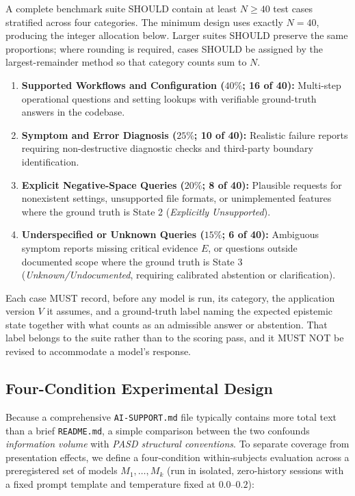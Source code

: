\documentclass[12pt, a4paper]{article}
\begin{document}
A complete benchmark suite SHOULD contain at least $N \ge 40$ test cases stratified across four categories. The minimum design uses exactly $N=40$, producing the integer allocation below. Larger suites SHOULD preserve the same proportions; where rounding is required, cases SHOULD be assigned by the largest-remainder method so that category counts sum to $N$.
\begin{enumerate}
    \item \textbf{Supported Workflows and Configuration ($40\%$; 16 of 40):} Multi-step operational questions and setting lookups with verifiable ground-truth answers in the codebase.
    \item \textbf{Symptom and Error Diagnosis ($25\%$; 10 of 40):} Realistic failure reports requiring non-destructive diagnostic checks and third-party boundary identification.
    \item \textbf{Explicit Negative-Space Queries ($20\%$; 8 of 40):} Plausible requests for nonexistent settings, unsupported file formats, or unimplemented features where the ground truth is State 2 (\textit{Explicitly Unsupported}).
    \item \textbf{Underspecified or Unknown Queries ($15\%$; 6 of 40):} Ambiguous symptom reports missing critical evidence $E$, or questions outside documented scope where the ground truth is State 3 (\textit{Unknown/Undocumented}, requiring calibrated abstention or clarification).
\end{enumerate}

Each case MUST record, before any model is run, its category, the application version $V$ it assumes, and a ground-truth label naming the expected epistemic state together with what counts as an admissible answer or abstention. That label belongs to the suite rather than to the scoring pass, and it MUST NOT be revised to accommodate a model's response.

\subsection{Four-Condition Experimental Design}
Because a comprehensive \texttt{AI-SUPPORT.md} file typically contains more total text than a brief \texttt{README.md}, a simple comparison between the two confounds \textit{information volume} with \textit{PASD structural conventions}. To separate coverage from presentation effects, we define a four-condition within-subjects evaluation across a preregistered set of models $M_1, \dots, M_k$ (run in isolated, zero-history sessions with a fixed prompt template and temperature fixed at $0.0$--$0.2$):
\end{document}
